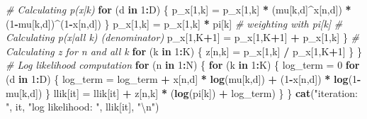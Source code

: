 \documentclass[]{article}
\newenvironment{Shaded}{\begin{snugshade}}{\end{snugshade}}
\newcommand{\KeywordTok}[1]{\textcolor[rgb]{0.13,0.29,0.53}{\textbf{#1}}}
\newcommand{\DecValTok}[1]{\textcolor[rgb]{0.00,0.00,0.81}{#1}}
\newcommand{\CharTok}[1]{\textcolor[rgb]{0.31,0.60,0.02}{#1}}
\newcommand{\StringTok}[1]{\textcolor[rgb]{0.31,0.60,0.02}{#1}}
\newcommand{\CommentTok}[1]{\textcolor[rgb]{0.56,0.35,0.01}{\textit{#1}}}
\newcommand{\ControlFlowTok}[1]{\textcolor[rgb]{0.13,0.29,0.53}{\textbf{#1}}}
\newcommand{\OperatorTok}[1]{\textcolor[rgb]{0.81,0.36,0.00}{\textbf{#1}}}
\newcommand{\NormalTok}[1]{#1}
\begin{document}
\begin{Shaded}
\begin{Highlighting}[]
\CommentTok{# Calculating p(x|k)}
\ControlFlowTok{for}\NormalTok{ (d }\ControlFlowTok{in} \DecValTok{1}\OperatorTok{:}\NormalTok{D) \{}
\NormalTok{p_x[}\DecValTok{1}\NormalTok{,k] =}\StringTok{ }\NormalTok{p_x[}\DecValTok{1}\NormalTok{,k] }\OperatorTok{*}\StringTok{ }\NormalTok{(mu[k,d]}\OperatorTok{^}\NormalTok{x[n,d]) }\OperatorTok{*}\StringTok{ }\NormalTok{(}\DecValTok{1}\OperatorTok{-}\NormalTok{mu[k,d])}\OperatorTok{^}\NormalTok{(}\DecValTok{1}\OperatorTok{-}\NormalTok{x[n,d])}
\NormalTok{\}}
\NormalTok{p_x[}\DecValTok{1}\NormalTok{,k] =}\StringTok{ }\NormalTok{p_x[}\DecValTok{1}\NormalTok{,k] }\OperatorTok{*}\StringTok{ }\NormalTok{pi[k] }\CommentTok{# weighting with pi[k]}
\CommentTok{# Calculating p(x|all k) (denominator)}
\NormalTok{p_x[}\DecValTok{1}\NormalTok{,K}\OperatorTok{+}\DecValTok{1}\NormalTok{] =}\StringTok{ }\NormalTok{p_x[}\DecValTok{1}\NormalTok{,K}\OperatorTok{+}\DecValTok{1}\NormalTok{] }\OperatorTok{+}\StringTok{ }\NormalTok{p_x[}\DecValTok{1}\NormalTok{,k]}
\NormalTok{\}}
\CommentTok{# Calculating z for n and all k}
\ControlFlowTok{for}\NormalTok{ (k }\ControlFlowTok{in} \DecValTok{1}\OperatorTok{:}\NormalTok{K) \{}
\NormalTok{z[n,k] =}\StringTok{ }\NormalTok{p_x[}\DecValTok{1}\NormalTok{,k] }\OperatorTok{/}\StringTok{ }\NormalTok{p_x[}\DecValTok{1}\NormalTok{,K}\OperatorTok{+}\DecValTok{1}\NormalTok{]}
\NormalTok{\}}
\NormalTok{\}}
\CommentTok{# Log likelihood computation}
\ControlFlowTok{for}\NormalTok{ (n }\ControlFlowTok{in} \DecValTok{1}\OperatorTok{:}\NormalTok{N) \{}
\ControlFlowTok{for}\NormalTok{ (k }\ControlFlowTok{in} \DecValTok{1}\OperatorTok{:}\NormalTok{K) \{}
\NormalTok{log_term =}\StringTok{ }\DecValTok{0}
\ControlFlowTok{for}\NormalTok{ (d }\ControlFlowTok{in} \DecValTok{1}\OperatorTok{:}\NormalTok{D) \{}
\NormalTok{log_term =}\StringTok{ }\NormalTok{log_term }\OperatorTok{+}\StringTok{ }\NormalTok{x[n,d] }\OperatorTok{*}\StringTok{ }\KeywordTok{log}\NormalTok{(mu[k,d]) }\OperatorTok{+}\StringTok{ }\NormalTok{(}\DecValTok{1}\OperatorTok{-}\NormalTok{x[n,d]) }\OperatorTok{*}\StringTok{ }\KeywordTok{log}\NormalTok{(}\DecValTok{1}\OperatorTok{-}\NormalTok{mu[k,d])}
\NormalTok{\}}
\NormalTok{llik[it] =}\StringTok{ }\NormalTok{llik[it] }\OperatorTok{+}\StringTok{ }\NormalTok{z[n,k] }\OperatorTok{*}\StringTok{ }\NormalTok{(}\KeywordTok{log}\NormalTok{(pi[k]) }\OperatorTok{+}\StringTok{ }\NormalTok{log_term)}
\NormalTok{\}}
\NormalTok{\}}
\KeywordTok{cat}\NormalTok{(}\StringTok{"iteration: "}\NormalTok{, it, }\StringTok{"log likelihood: "}\NormalTok{, llik[it], }\StringTok{"}\CharTok{\textbackslash{}n}\StringTok{"}\NormalTok{)}

\end{Highlighting}
\end{Shaded}
\end{document}
